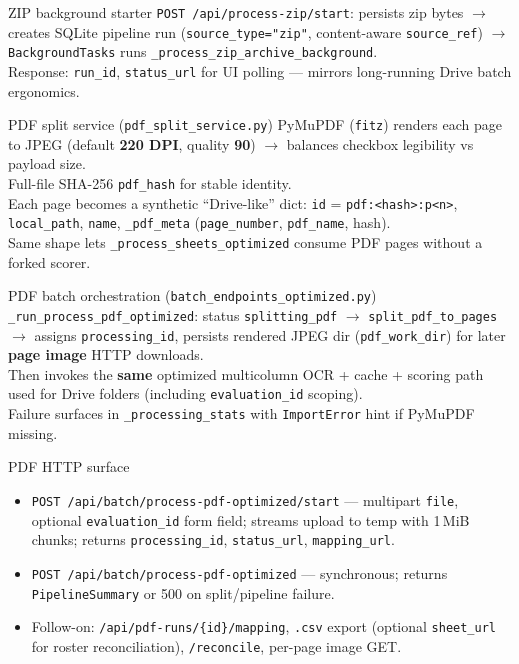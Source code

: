 \documentclass[aspectratio=169]{beamer}
\begin{document}
\begin{frame}{ZIP background starter}
  \small
  \texttt{POST /api/process-zip/start}: persists zip bytes $\rightarrow$ creates SQLite pipeline run (\texttt{source\_type="zip"}, content-aware \texttt{source\_ref}) $\rightarrow$ \texttt{BackgroundTasks} runs \texttt{\_process\_zip\_archive\_background}.\\
  Response: \texttt{run\_id}, \texttt{status\_url} for UI polling --- mirrors long-running Drive batch ergonomics.
\end{frame}

\begin{frame}{PDF split service (\texttt{pdf\_split\_service.py})}
  \small
  PyMuPDF (\texttt{fitz}) renders each page to JPEG (default \textbf{220 DPI}, quality \textbf{90}) $\rightarrow$ balances checkbox legibility vs payload size.\\
  Full-file SHA-256 \texttt{pdf\_hash} for stable identity.\\
  Each page becomes a synthetic ``Drive-like'' dict: \texttt{id} = \texttt{pdf:<hash>:p<n>}, \texttt{local\_path}, \texttt{name}, \texttt{\_pdf\_meta} (\texttt{page\_number}, \texttt{pdf\_name}, hash).\\
  Same shape lets \texttt{\_process\_sheets\_optimized} consume PDF pages without a forked scorer.
\end{frame}

\begin{frame}{PDF batch orchestration (\texttt{batch\_endpoints\_optimized.py})}
  \small
  \texttt{\_run\_process\_pdf\_optimized}: status \texttt{splitting\_pdf} $\rightarrow$ \texttt{split\_pdf\_to\_pages} $\rightarrow$ assigns \texttt{processing\_id}, persists rendered JPEG dir (\texttt{pdf\_work\_dir}) for later \textbf{page image} HTTP downloads.\\
  Then invokes the \textbf{same} optimized multicolumn OCR + cache + scoring path used for Drive folders (including \texttt{evaluation\_id} scoping).\\
  Failure surfaces in \texttt{\_processing\_stats} with \texttt{ImportError} hint if PyMuPDF missing.
\end{frame}

\begin{frame}{PDF HTTP surface}
  \tiny
  \begin{itemize}\setlength\itemsep{0.1em}
    \item \texttt{POST /api/batch/process-pdf-optimized/start} --- multipart \texttt{file}, optional \texttt{evaluation\_id} form field; streams upload to temp with 1\,MiB chunks; returns \texttt{processing\_id}, \texttt{status\_url}, \texttt{mapping\_url}.
    \item \texttt{POST /api/batch/process-pdf-optimized} --- synchronous; returns \texttt{PipelineSummary} or 500 on split/pipeline failure.
    \item Follow-on: \texttt{/api/pdf-runs/\{id\}/mapping}, \texttt{.csv} export (optional \texttt{sheet\_url} for roster reconciliation), \texttt{/reconcile}, per-page image GET.
  \end{itemize}
\end{frame}
\end{document}
